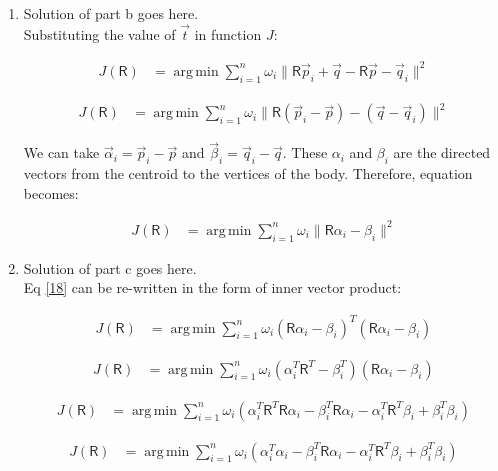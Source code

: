 \documentclass[a4paper, 11pt]{article}
\newcommand{\mat}[1]{\boldsymbol { \mathsf{#1}} }
\DeclareMathOperator*{\argmin}{arg\,min}
\newcommand{\norm}[1]{\lVert#1\rVert}
\begin{document}
\begin{enumerate}[label=\alph*.]
    
    

    
    \item
    Solution of part b goes here.\\
    
    Substituting the value of $\vec t$ in function $J$:
    
    \begin{align}
  J(\mat R) &= \argmin\sum_{i=1}^{n}\omega_i\norm{\mat R\vec p_i+ \vec q - \mat R \vec p -\vec q_i}^2
    \end{align}
    
    \begin{align}
  J(\mat R) &= \argmin\sum_{i=1}^{n}\omega_i\norm{\mat R (\vec p_i - \vec p) - (\vec q -\vec q_i)}^2
    \end{align}
    
    We can take $\vec \alpha_i = \vec p_i - \vec p$ and $\vec \beta_i = \vec q_i - \vec q$. These $\alpha_i$ and $\beta_i$ are the directed vectors from the centroid to the vertices of the body. Therefore, equation becomes:
    
    \begin{align}
  J(\mat R) &= \argmin\sum_{i=1}^{n}\omega_i\norm{\mat R \alpha_i - \beta_i}^2 \label{18}
    \end{align}
    
    \item
    Solution of part c goes here.\\
    
    Eq \eqref{18} can be re-written in the form of inner vector product:
    
    \begin{align}
  J(\mat R) &= \argmin\sum_{i=1}^{n}\omega_i (\mat R \alpha_i - \beta_i)^T(\mat R \alpha_i - \beta_i)
    \end{align}
    
    \begin{align}
  J(\mat R) &= \argmin\sum_{i=1}^{n}\omega_i (\alpha_i^T \mat R^T - \beta_i^T)(\mat R \alpha_i - \beta_i)
    \end{align}
    
    \begin{align}
  J(\mat R) &= \argmin\sum_{i=1}^{n}\omega_i (\alpha_i^T \mat R^T \mat R \alpha_i - \beta_i^T \mat R \alpha_i -  \alpha_i^T \mat R^T \beta_i + \beta_i^T \beta_i )
    \end{align}
    
    \begin{align}
  J(\mat R) &= \argmin\sum_{i=1}^{n}\omega_i (\alpha_i^T \alpha_i - \beta_i^T \mat R \alpha_i -  \alpha_i^T \mat R^T \beta_i + \beta_i^T \beta_i )\label{22}
    \end{align}
    

\end{enumerate}
\end{document}
